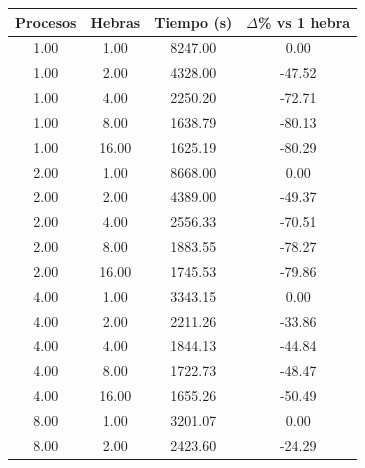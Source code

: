 \begin{table}[ht]
    \centering
    \begin{tabular}{|c|c|c|c|}
        \hline
        \textbf{Procesos} & \textbf{Hebras} & \textbf{Tiempo (s)} & \textbf{$\Delta$\% vs 1 hebra} \\
        \hline
        1.00              & 1.00            & 8247.00             & 0.00                           \\
        1.00              & 2.00            & 4328.00             & -47.52                         \\
        1.00              & 4.00            & 2250.20             & -72.71                         \\
        1.00              & 8.00            & 1638.79             & -80.13                         \\
        1.00              & 16.00           & 1625.19             & -80.29                         \\
        2.00              & 1.00            & 8668.00             & 0.00                           \\
        2.00              & 2.00            & 4389.00             & -49.37                         \\
        2.00              & 4.00            & 2556.33             & -70.51                         \\
        2.00              & 8.00            & 1883.55             & -78.27                         \\
        2.00              & 16.00           & 1745.53             & -79.86                         \\
        4.00              & 1.00            & 3343.15             & 0.00                           \\
        4.00              & 2.00            & 2211.26             & -33.86                         \\
        4.00              & 4.00            & 1844.13             & -44.84                         \\
        4.00              & 8.00            & 1722.73             & -48.47                         \\
        4.00              & 16.00           & 1655.26             & -50.49                         \\
        8.00              & 1.00            & 3201.07             & 0.00                           \\
        8.00              & 2.00            & 2423.60             & -24.29                         \\

\end{tabular}
\end{table}
